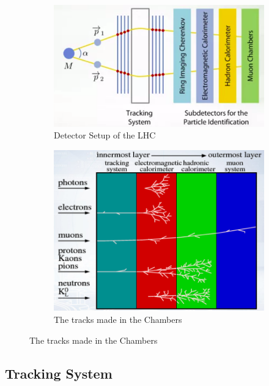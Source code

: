 \begin{figure}[H]
  \centering
  \begin{subfigure}[b]{0.5\textwidth}
    \centering
    \includegraphics[width=\linewidth]{img/hadron/particleid-detector-setup.png}
    \caption{Detector Setup of the LHC}
    \label{fig:particleid-detector-setup}
  \end{subfigure}
  \begin{subfigure}[b]{0.4\textwidth}
    \centering
    \includegraphics[width=\linewidth]{img/hadron/particleid-tracking.png}
    \caption{The tracks made in the Chambers}
    \label{fig:particleid-tracking}
  \end{subfigure}
\end{figure}


\subsection{Tracking System}

